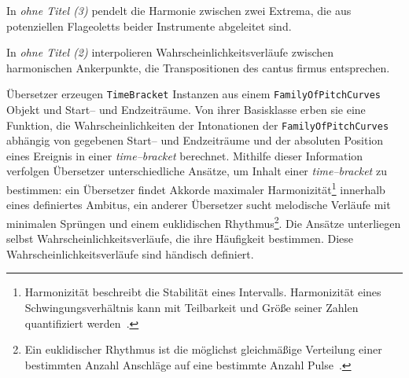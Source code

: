 \documentclass[12pt,a4paper,ngerman]{article}
\begin{document}
\smallskip

In \emph{ohne Titel (3)} pendelt die Harmonie zwischen zwei Extrema, die aus potenziellen Flageoletts beider Instrumente abgeleitet sind.

\smallskip

In \emph{ohne Titel (2)} interpolieren Wahrscheinlichkeitsverläufe zwischen harmonischen Ankerpunkte, die Transpositionen des cantus firmus entsprechen.

\smallskip

Übersetzer erzeugen \texttt{TimeBracket} Instanzen aus einem \texttt{FamilyOfPitchCurves} Objekt und Start-- und Endzeiträume.
Von ihrer Basisklasse erben sie eine Funktion, die Wahrscheinlichkeiten der Intonationen der \texttt{FamilyOfPitchCurves} abhängig von gegebenen Start-- und Endzeiträume und der absoluten Position eines Ereignis in einer \emph{time--bracket} berechnet.
Mithilfe dieser Information verfolgen Übersetzer unterschiedliche Ansätze, um Inhalt einer \emph{time--bracket} zu bestimmen:
ein Übersetzer findet Akkorde maximaler Harmonizität\footnote{%
    Harmonizität beschreibt die Stabilität eines Intervalls.
    Harmonizität eines Schwingungsverhältnis kann mit Teilbarkeit und Größe seiner Zahlen quantifiziert werden~\parencite[S. 5f]{barlowHarmonicity}.
} innerhalb eines definiertes Ambitus,
ein anderer Übersetzer sucht melodische Verläufe mit minimalen Sprüngen und einem euklidischen Rhythmus\footnote{%
    Ein euklidischer Rhythmus ist die möglichst gleichmäßige Verteilung einer bestimmten Anzahl Anschläge auf eine bestimmte Anzahl Pulse~\parencite{toussaintEuclidean}.
}.
Die Ansätze unterliegen selbst Wahrscheinlichkeitsverläufe, die ihre Häufigkeit bestimmen.
Diese Wahrscheinlichkeitsverläufe sind händisch definiert.
\end{document}
